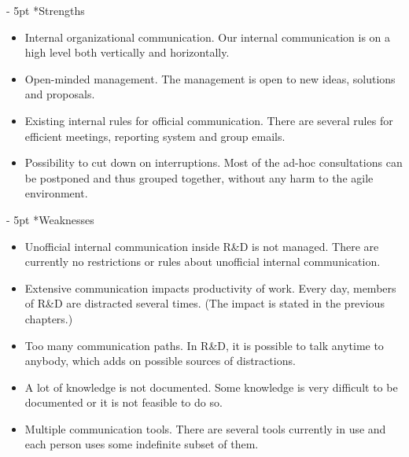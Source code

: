 \documentclass[11pt,singleside]{myfithesis2}
\makeatletter
\renewcommand\paragraph{
   \vspace{-10pt}
   \@startsection{paragraph}{4}{0mm}
      {\baselineskip}
      {- 5pt}
      {\normalfont\normalsize\bfseries}
}
\makeatother
\begin{document}
\paragraph*{Strengths}
\begin{itemize}
	\item Internal organizational communication. Our internal communication is on a high level both vertically and horizontally.
	\item Open-minded management. The management is open to new ideas, solutions and proposals.
	\item Existing internal rules for official communication. There are several rules for efficient meetings, reporting system and group emails.
	\item Possibility to cut down on interruptions. Most of the ad-hoc consultations can be postponed and thus grouped together, without any harm to the agile environment.
\end{itemize}
\paragraph*{Weaknesses}
\begin{itemize}
	\item Unofficial internal communication inside R\&D is not managed. There are currently no restrictions or rules about unofficial internal communication.
	\item Extensive communication impacts productivity of work. Every day, members of R\&D are distracted several times. (The impact is stated in the previous chapters.)
	\item Too many communication paths. In R\&D, it is possible to talk anytime to anybody, which adds on possible sources of distractions.
	\item A lot of knowledge is not documented. Some knowledge is very difficult to be documented or it is not feasible to do so.
	\item Multiple communication tools. There are several tools currently in use and each person uses some indefinite subset of them.
\end{itemize}
\end{document}
